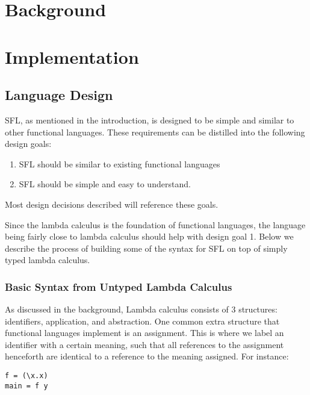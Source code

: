 \documentclass[
author={Kiran Sturt},
degree={BSc},
title={Implementing a Step by Step Evaluator for a Simple Functional Programming language},
unit={COMS30045},]{dissertation}
\theoremstyle{definition}
\theoremstyle{break}
\theoremstyle{definition}
\begin{document}

\chapter{Background}
\label{chap:technical}



\chapter{Implementation}
\label{chap:execution}

\section{Language Design}
SFL, as mentioned in the introduction, is designed to be simple and similar to other functional languages. These requirements can be distilled into the following design goals:
\begin{enumerate}
    \item SFL should be similar to existing functional languages
    \item SFL should be simple and easy to understand. 
\end{enumerate}
Most design decisions described will reference these goals.

Since the lambda calculus is the foundation of functional languages, the language being fairly close to lambda calculus should help with design goal 1. Below we describe the process of building some of the syntax for SFL on top of simply typed lambda calculus.

\subsection{Basic Syntax from Untyped Lambda Calculus}
As discussed in the background, Lambda calculus consists of 3 structures: identifiers, application, and abstraction. One common extra structure that functional languages implement is an assignment. This is where we label an identifier with a certain meaning, such that all references to the assignment henceforth are identical to a reference to the meaning assigned. For instance:

\begin{lstlisting}[]
f = (\x.x)
main = f y
\end{lstlisting}
\end{document}
